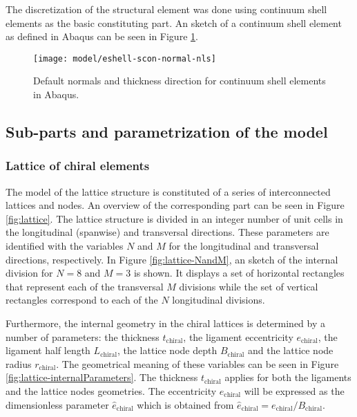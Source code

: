   The discretization of the structural element was done using continuum shell elements as the basic constituting part. An sketch of a continuum shell element as defined in Abaqus can be seen in Figure \ref{fig:shellElement}.

  \begin{figure}[!htpb]
    \centering
    \texttt{[image: model/eshell-scon-normal-nls]}
    \caption[Default normals and thickness direction for continuum shell elements in Abaqus]{Default normals and thickness direction for continuum shell elements in Abaqus. \cite{Abaqus}}\label{fig:shellElement}
  \end{figure}

  \subsection{Sub-parts and parametrization of the model} \label{subsec:parametrization_Model}

    \subsubsection{Lattice of chiral elements} \label{subsubsec:lattice_Parametrization}

    The model of the lattice structure is constituted of a series of interconnected lattices and nodes. An overview of the corresponding part can be seen in Figure \ref{fig:lattice}. The lattice structure is divided in an integer number of unit cells in the longitudinal (spanwise) and transversal directions. These parameters are identified with the variables $N$ and $M$ for the longitudinal and transversal directions, respectively. In Figure \ref{fig:lattice-NandM}, an sketch of the internal division for $N = 8$ and $M = 3$ is shown. It displays a set of horizontal rectangles that represent each of the transversal $M$ divisions while the set of vertical rectangles correspond to each of the $N$ longitudinal divisions.

    Furthermore, the internal geometry in the chiral lattices is determined by a number of parameters: the thickness $t_{\mathrm{chiral}}$, the ligament eccentricity $e_{\mathrm{chiral}}$, the ligament half length $L_{\mathrm{chiral}}$, the lattice node depth $B_{\mathrm{chiral}}$ and the lattice node radius $r_{\mathrm{chiral}}$. The geometrical meaning of these variables can be seen in Figure \ref{fig:lattice-internalParameters}. The thickness $t_{\mathrm{chiral}}$ applies for both the ligaments and the lattice nodes geometries. The eccentricity $e_{\mathrm{chiral}}$ will be expressed as the dimensionless parameter $\hat{e}_{\mathrm{chiral}}$ which is obtained from $\hat{e}_{\mathrm{chiral}} = e_{\mathrm{chiral}} / B_{\mathrm{chiral}}$.

